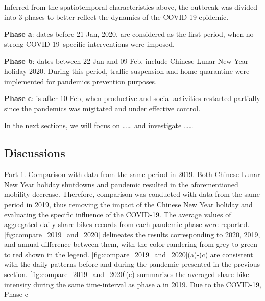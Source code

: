 \documentclass[preprints,ijgi,submit,moreauthors]{Definitions/mdpi}
\begin{document}
Inferred from the spatiotemporal characteristics above, the outbreak was divided into 3 phases to better reflect the dynamics of the COVID-19 epidemic.

\textbf{Phase a}: dates before 21 Jan, 2020, are considered as the first period, when no strong COVID-19–specific interventions were imposed.

\textbf{Phase b}: dates between 22 Jan and 09 Feb, include Chinese Lunar New Year holiday 2020. During this period, traffic suspension and home quarantine were implemented for pandemics prevention purposes.

\textbf{Phase c}: is after 10 Feb, when productive and social activities restarted partially since the pandemics was migitated and under effective control.

In the next sections, we will focus on …… and investigate ……

\subsection{Discussions}
Part 1. Comparison with data from the same period in 2019.
Both Chinese Lunar New Year holiday shutdowns and pandemic resulted in the aforementioned mobility decrease.
Therefore, comparison was conducted with data from the same period in 2019, thus removing the impact of the Chinese New Year holiday and evaluating the specific influence of the COVID-19.  
The average values of aggregated daily share-bikes records from each pandemic phase were reported.
\ref{fig:compare_2019_and_2020} delineates the results corresponding to 2020, 2019, and annual difference between them, with the color randering from grey to green to red shown in the legend.
\ref{fig:compare_2019_and_2020}(a)-(c) are consistent with the daily patterns before and during the pandemic presented in the previous section.
\ref{fig:compare_2019_and_2020}(e) summarizes the averaged share-bike intensity during the same time-interval as phase a in 2019.
Due to the COVID-19, 
Phase c 
\end{document}
